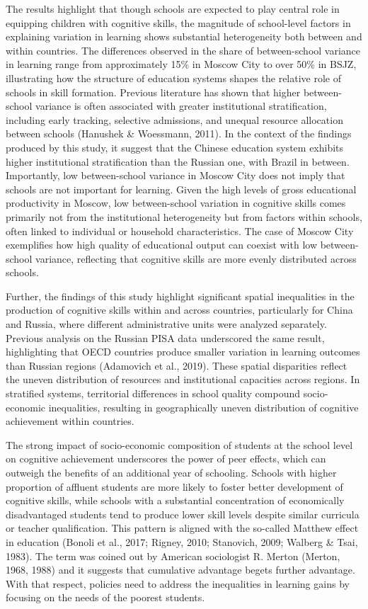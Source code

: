 \documentclass[
]{article}
\begin{document}
The results highlight that though schools are expected to play central
role in equipping children with cognitive skills, the magnitude of
school-level factors in explaining variation in learning shows
substantial heterogeneity both between and within countries. The
differences observed in the share of between-school variance in learning
range from approximately 15\% in Moscow City to over 50\% in BSJZ,
illustrating how the structure of education systems shapes the relative
role of schools in skill formation. Previous literature has shown that
higher between-school variance is often associated with greater
institutional stratification, including early tracking, selective
admissions, and unequal resource allocation between schools (Hanushek \&
Woessmann, 2011). In the context of the findings produced by this study,
it suggest that the Chinese education system exhibits higher
institutional stratification than the Russian one, with Brazil in
between. Importantly, low between-school variance in Moscow City does
not imply that schools are not important for learning. Given the high
levels of gross educational productivity in Moscow, low between-school
variation in cognitive skills comes primarily not from the institutional
heterogeneity but from factors within schools, often linked to
individual or household characteristics. The case of Moscow City
exemplifies how high quality of educational output can coexist with low
between-school variance, reflecting that cognitive skills are more
evenly distributed across schools.

Further, the findings of this study highlight significant spatial
inequalities in the production of cognitive skills within and across
countries, particularly for China and Russia, where different
administrative units were analyzed separately. Previous analysis on the
Russian PISA data underscored the same result, highlighting that OECD
countries produce smaller variation in learning outcomes than Russian
regions (Adamovich et al., 2019). These spatial disparities reflect the
uneven distribution of resources and institutional capacities across
regions. In stratified systems, territorial differences in school
quality compound socio-economic inequalities, resulting in
geographically uneven distribution of cognitive achievement within
countries.

The strong impact of socio-economic composition of students at the
school level on cognitive achievement underscores the power of peer
effects, which can outweigh the benefits of an additional year of
schooling. Schools with higher proportion of affluent students are more
likely to foster better development of cognitive skills, while schools
with a substantial concentration of economically disadvantaged students
tend to produce lower skill levels despite similar curricula or teacher
qualification. This pattern is aligned with the so-called Matthew effect
in education (Bonoli et al., 2017; Rigney, 2010; Stanovich, 2009;
Walberg \& Tsai, 1983). The term was coined out by American sociologist
R. Merton (Merton, 1968, 1988) and it suggests that cumulative advantage
begets further advantage. With that respect, policies need to address
the inequalities in learning gains by focusing on the needs of the
poorest students.
\end{document}
